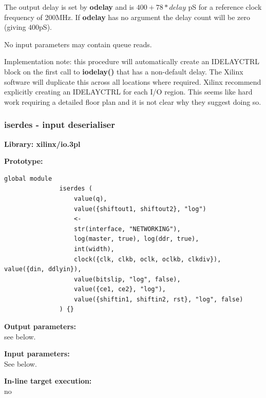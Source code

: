             The output delay is set by {\bf odelay} and is $400 + 78 * delay$ pS
            for a reference clock frequency of 200MHz. If {\bf odelay} has no
            argument the delay count will be zero (giving $400$pS).

            No input parameters may contain queue reads.

            Implementation note: this procedure will automatically create an
            IDELAYCTRL block on the first call to {\bf iodelay()} that has a
            non-default delay. The Xilinx software will duplicate this across
            all locations where required. Xilinx recommend explicitly creating
            an IDELAYCTRL for each I/O region. This seems like hard work
            requiring a detailed floor plan and it is not clear why they suggest
            doing so.




        \subsubsection{iserdes - input deserialiser}\label{sec:lpiserdes}

            {\bf Library: xilinx/io.3pl}

            {\bf Prototype:} \\
            \vsp
            \begin{lstlisting}[gobble=12, language=threepl]
               global module
               iserdes (
                   value(q),
                   value({shiftout1, shiftout2}, "log")
                   <-
                   str(interface, "NETWORKING"),
                   log(master, true), log(ddr, true),
                   int(width),
                   clock({clk, clkb, oclk, oclkb, clkdiv}), value({din, ddlyin}),
                   value(bitslip, "log", false),
                   value({ce1, ce2}, "log"),
                   value({shiftin1, shiftin2, rst}, "log", false)
               ) {}
            \end{lstlisting}

            {\bf Output parameters:} \\
            see below.

            {\bf Input parameters:} \\            
            See below.
        
            {\bf In-line target execution:} \\
            no

